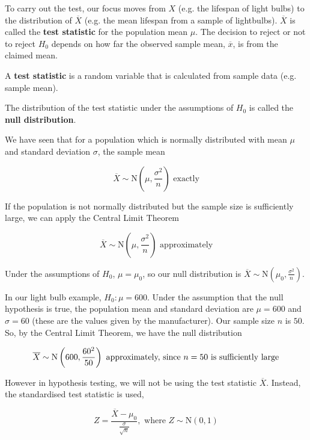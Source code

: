 \documentclass[11pt,a4paper]{book}
\begin{document}
To carry out the test, our focus moves from $X$ (e.g. the lifespan
of light bulbs) to the distribution of $\overline{X}$ (e.g. the mean
lifespan from a sample of lightbulbs). $\overline{X}$ is called the
\textbf{test statistic} for the population mean $\mu$. The decision
to reject or not to reject $H_{0}$ depends on how far the observed
sample mean, $\overline{x}$, is from the claimed mean.

\begin{tcolorbox}[colback=blue!5, colframe=black, boxrule=.4pt, sharpish corners]

A \textbf{test statistic} is a random variable that is calculated
from sample data (e.g. sample mean).

\medskip

The distribution of the test statistic under the assumptions of $H_{0}$
is called the \textbf{null distribution}.
\end{tcolorbox}

We have seen that for a population which is normally distributed with
mean $\mu$ and standard deviation $\sigma$, the sample mean

\[
\overline{X}\sim\text{N}\left(\mu,\frac{\sigma^{2}}{n}\right)\text{ exactly}
\]

If the population is not normally distributed but the sample size
is sufficiently large, we can apply the Central Limit Theorem

\[
\overline{X}\sim\text{N}\left(\mu,\frac{\sigma^{2}}{n}\right)\text{ approximately}
\]

Under the assumptions of $H_{0}$, $\mu=\mu_{0}$, so our null distribution
is ${\displaystyle \overline{X}\sim\text{N}\left(\mu_{0},\frac{\sigma^{2}}{n}\right)}$.

In our light bulb example, $H_{0}:\mu=600$. Under the assumption
that the null hypothesis is true, the population mean and standard
deviation are $\mu=600$ and $\sigma=60$ (these are the values given
by the manufacturer). Our sample size $n$ is $50$. So, by the Central
Limit Theorem, we have the null distribution

\[
\overline{X}\sim\text{N}\left(600,\frac{60^{2}}{50}\right)\text{ approximately, since \ensuremath{n=50} is sufficiently large}
\]

However in hypothesis testing, we will not be using the test statistic
$\overline{X}$. Instead, the standardised test statistic is used,

\[
Z=\frac{\overline{X}-\mu_{0}}{\frac{\sigma}{\sqrt{n}}},\text{ where }Z\sim\text{N}\left(0,1\right)
\]
\end{document}
